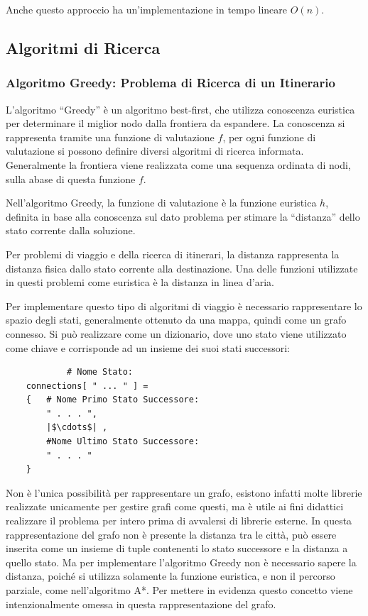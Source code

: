 \documentclass{article}
\numberwithin{equation}{subsection}
\begin{document}
Anche questo approccio ha un'implementazione in tempo lineare $O(n)$. 

\subsection{Algoritmi di Ricerca}

\subsubsection{Algoritmo Greedy: Problema di Ricerca di un Itinerario}

L'algoritmo ``Greedy'' è un algoritmo best-first, che utilizza conoscenza euristica per 
determinare il miglior nodo dalla frontiera da espandere. La conoscenza si rappresenta tramite 
una funzione di valutazione $f$, per ogni funzione di valutazione si possono definire diversi 
algoritmi di ricerca informata. Generalmente la frontiera viene realizzata come una sequenza 
ordinata di nodi, sulla abase di questa funzione $f$. 

Nell'algoritmo Greedy, la funzione di valutazione è la funzione euristica $h$, definita in 
base alla conoscenza sul dato problema per stimare la ``distanza'' dello stato corrente dalla soluzione. 

Per problemi di viaggio e della ricerca di itinerari, la distanza rappresenta la distanza fisica 
dallo stato corrente alla destinazione. Una delle funzioni utilizzate in questi problemi come 
euristica è la distanza in linea d'aria. 

Per implementare questo tipo di algoritmi di viaggio è necessario rappresentare lo spazio degli 
stati, generalmente ottenuto da una mappa, quindi come un grafo connesso. Si può realizzare 
come un dizionario, dove uno stato viene utilizzato come chiave e corrisponde ad un insieme 
dei suoi stati successori:
\begin{verbatim}
            # Nome Stato:   
    connections[ " ... " ] = 
    {   # Nome Primo Stato Successore:
        " . . . ",     
        |$\cdots$| , 
        #Nome Ultimo Stato Successore:
        " . . . " 
    }
\end{verbatim}

Non è l'unica possibilità per rappresentare un grafo, esistono infatti molte librerie 
realizzate unicamente per gestire grafi come questi, ma è utile ai fini didattici realizzare 
il problema per intero prima di avvalersi di librerie esterne. 
In questa rappresentazione del grafo non è presente la distanza tra le città, può essere inserita 
come un insieme di tuple contenenti lo stato successore e la distanza a quello stato. 
Ma per implementare l'algoritmo Greedy non è necessario sapere la distanza, poiché si utilizza 
solamente la funzione euristica, e non il percorso parziale, come nell'algoritmo A*. 
Per mettere in evidenza questo concetto viene intenzionalmente omessa in questa rappresentazione 
del grafo. 
\end{document}
